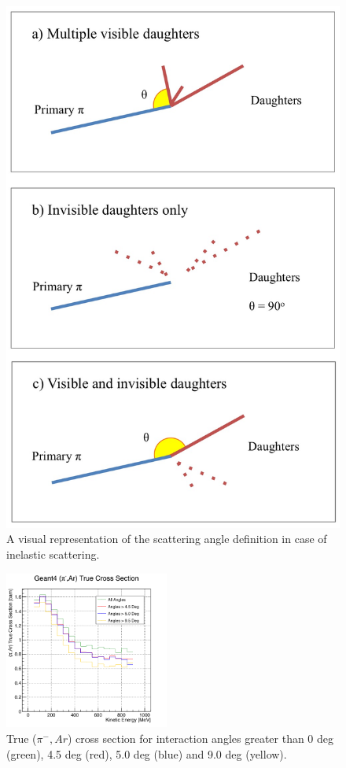 \begin{figure}[ht]
\begin{minipage}[t]{0.45\linewidth}
\includegraphics[width=\textwidth]{Chapter-5/Images/Daughters.png}
\caption{A visual representation of the scattering angle definition in case of inelastic scattering.}
\label{fig:scatterPic}
\end{minipage}
\end{figure}

\begin{figure}[p]
\centering
\includegraphics[width=0.48\textwidth]{Chapter-5/Images/cTrueXSAngle.png}
\caption{ True ($\pi^-, Ar$) cross section for interaction angles greater than 0 deg (green), 4.5 deg (red), 5.0 deg  (blue) and 9.0 deg (yellow). }
\label{fig:trueWithAngles}
\end{figure}



